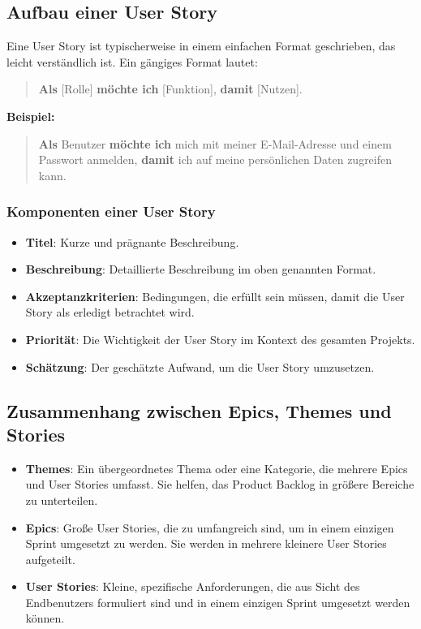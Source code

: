 \subsection{Aufbau einer User Story}

Eine User Story ist typischerweise in einem einfachen Format geschrieben, das leicht verständlich ist. Ein gängiges Format lautet:

\begin{quote}
\textbf{Als} [Rolle] \textbf{möchte ich} [Funktion], \textbf{damit} [Nutzen].
\end{quote}

\textbf{Beispiel:}

\begin{quote}
\textbf{Als} Benutzer \textbf{möchte ich} mich mit meiner E-Mail-Adresse und einem Passwort anmelden, \textbf{damit} ich auf meine persönlichen Daten zugreifen kann.
\end{quote}

\subsubsection{Komponenten einer User Story}

\begin{itemize}
    \item \textbf{Titel}: Kurze und prägnante Beschreibung.
    \item \textbf{Beschreibung}: Detaillierte Beschreibung im oben genannten Format.
    \item \textbf{Akzeptanzkriterien}: Bedingungen, die erfüllt sein müssen, damit die User Story als erledigt betrachtet wird.
    \item \textbf{Priorität}: Die Wichtigkeit der User Story im Kontext des gesamten Projekts.
    \item \textbf{Schätzung}: Der geschätzte Aufwand, um die User Story umzusetzen.
\end{itemize}

\subsection{Zusammenhang zwischen Epics, Themes und Stories}

\begin{itemize}
    \item \textbf{Themes}: Ein übergeordnetes Thema oder eine Kategorie, die mehrere Epics und User Stories umfasst. Sie helfen, das Product Backlog in größere Bereiche zu unterteilen.
    \item \textbf{Epics}: Große User Stories, die zu umfangreich sind, um in einem einzigen Sprint umgesetzt zu werden. Sie werden in mehrere kleinere User Stories aufgeteilt.
    \item \textbf{User Stories}: Kleine, spezifische Anforderungen, die aus Sicht des Endbenutzers formuliert sind und in einem einzigen Sprint umgesetzt werden können.
\end{itemize}

